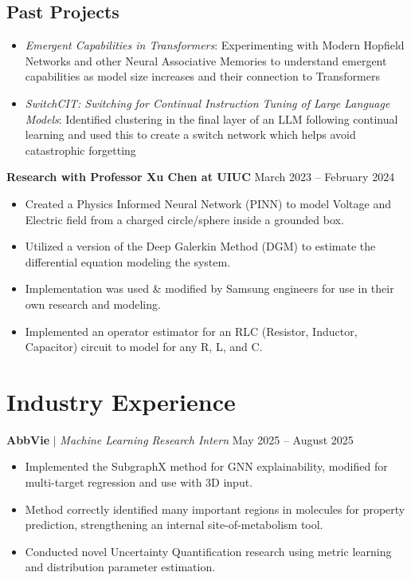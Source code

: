\documentclass[letterpaper,10pt]{article}
\begin{document}
\subsection{Past Projects}
\begin{itemize}[itemsep=-5pt, parsep=5pt, leftmargin=0.25in]
    \item \textit{Emergent Capabilities in Transformers}: Experimenting with Modern Hopfield Networks and other Neural Associative Memories to understand emergent capabilities as model size increases and their connection to Transformers
    \item \textit{SwitchCIT: Switching for Continual Instruction Tuning of Large Language Models}: Identified clustering in the final layer of an LLM following continual learning and used this to create a switch network which helps avoid catastrophic forgetting
\end{itemize}

\textbf{Research with Professor Xu Chen at UIUC} \hfill March 2023 -- February 2024\vspace{-5pt}
\begin{itemize}[itemsep=-5pt, parsep=5pt, leftmargin=0.25in]
    \item Created a Physics Informed Neural Network (PINN) to model Voltage and Electric field from a charged circle/sphere inside a grounded box.
    \item Utilized a version of the Deep Galerkin Method (DGM) to estimate the differential equation modeling the system.
    \item Implementation was used \& modified by Samsung engineers for use in their own research and modeling.
    \item Implemented an operator estimator for an RLC (Resistor, Inductor, Capacitor) circuit to model for any R, L, and C.
\end{itemize}


\section{Industry Experience}
\textbf{AbbVie} $|$ \textit{Machine Learning Research Intern} \hfill May 2025 -- August 2025\vspace{-5pt}
\begin{itemize}[itemsep=-5pt, parsep=5pt, leftmargin=0.25in]
    \item Implemented the SubgraphX method for GNN explainability, modified for multi-target regression and use with 3D input.
    \item Method correctly identified many important regions in molecules for property prediction, strengthening an internal site-of-metabolism tool.
    \item Conducted novel Uncertainty Quantification research using metric learning and distribution parameter estimation.
\end{itemize}
\end{document}
